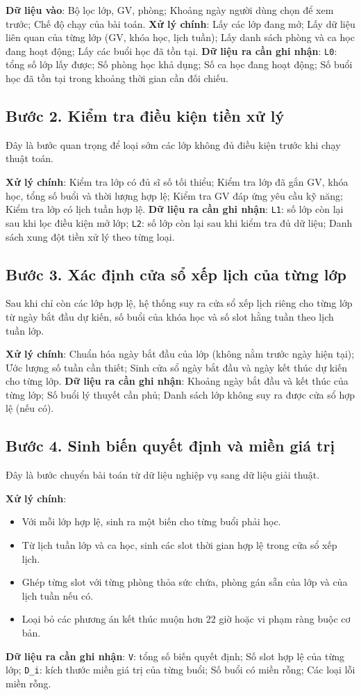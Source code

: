 \documentclass[../DoAn.tex]{subfiles}
\begin{document}
\textbf{Dữ liệu vào}: Bộ lọc lớp, GV, phòng; Khoảng ngày người dùng chọn để xem trước; Chế độ chạy của bài toán.
\textbf{Xử lý chính}: Lấy các lớp đang mở; Lấy dữ liệu liên quan của từng lớp (GV, khóa học, lịch tuần); Lấy danh sách phòng và ca học đang hoạt động; Lấy các buổi học đã tồn tại.
\textbf{Dữ liệu ra cần ghi nhận}: \texttt{L0}: tổng số lớp lấy được; Số phòng học khả dụng; Số ca học đang hoạt động; Số buổi học đã tồn tại trong khoảng thời gian cần đối chiếu.

\subsection{Bước 2. Kiểm tra điều kiện tiền xử lý}
Đây là bước quan trọng để loại sớm các lớp không đủ điều kiện trước khi chạy thuật toán.

\textbf{Xử lý chính}: Kiểm tra lớp có đủ sĩ số tối thiểu; Kiểm tra lớp đã gắn GV, khóa học, tổng số buổi và thời lượng hợp lệ; Kiểm tra GV đáp ứng yêu cầu kỹ năng; Kiểm tra lớp có lịch tuần hợp lệ.
\textbf{Dữ liệu ra cần ghi nhận}: \texttt{L1}: số lớp còn lại sau khi lọc điều kiện mở lớp; \texttt{L2}: số lớp còn lại sau khi kiểm tra đủ dữ liệu; Danh sách xung đột tiền xử lý theo từng loại.

\subsection{Bước 3. Xác định cửa sổ xếp lịch của từng lớp}
Sau khi chỉ còn các lớp hợp lệ, hệ thống suy ra cửa sổ xếp lịch riêng cho từng lớp từ ngày bắt đầu dự kiến, số buổi của khóa học và số slot hằng tuần theo lịch tuần lớp.

\textbf{Xử lý chính}: Chuẩn hóa ngày bắt đầu của lớp (không nằm trước ngày hiện tại); Ước lượng số tuần cần thiết; Sinh cửa sổ ngày bắt đầu và ngày kết thúc dự kiến cho từng lớp.
\textbf{Dữ liệu ra cần ghi nhận}: Khoảng ngày bắt đầu và kết thúc của từng lớp; Số buổi lý thuyết cần phủ; Danh sách lớp không suy ra được cửa sổ hợp lệ (nếu có).

\subsection{Bước 4. Sinh biến quyết định và miền giá trị}
Đây là bước chuyển bài toán từ dữ liệu nghiệp vụ sang dữ liệu giải thuật.

\textbf{Xử lý chính}:
\begin{itemize}
    \item Với mỗi lớp hợp lệ, sinh ra một biến cho từng buổi phải học.
    \item Từ lịch tuần lớp và ca học, sinh các slot thời gian hợp lệ trong cửa sổ xếp lịch.
    \item Ghép từng slot với từng phòng thỏa sức chứa, phòng gán sẵn của lớp và của lịch tuần nếu có.
    \item Loại bỏ các phương án kết thúc muộn hơn 22 giờ hoặc vi phạm ràng buộc cơ bản.
\end{itemize}
\textbf{Dữ liệu ra cần ghi nhận}: \texttt{V}: tổng số biến quyết định; Số slot hợp lệ của từng lớp; \texttt{D\_i}: kích thước miền giá trị của từng buổi; Số buổi có miền rỗng; Các loại lỗi miền rỗng.
\end{document}
